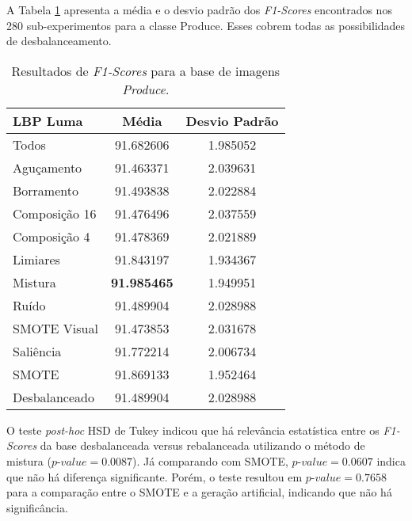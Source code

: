
A Tabela \ref{tab:resultados:3.3} apresenta a média e o desvio padrão dos \textit{F1-Scores} encontrados nos 280 sub-experimentos para a classe Produce. Esses cobrem todas as possibilidades de desbalanceamento.

\begin{table}[H]
\begin{center}
\caption{Resultados de \textit{F1-Scores} para a base de imagens \textit{Produce}.}
\label{tab:resultados:3.3}
\begin{tabular}{|l|c|c|}
\hline
\textbf{LBP Luma} & \textbf{Média}     & \textbf{Desvio Padrão} \\ \hline
   Todos        &  91.682606 &  1.985052  \\ \hline
  Aguçamento    &  91.463371 &  2.039631  \\ \hline
  Borramento    &  91.493838 &  2.022884  \\ \hline
  Composição 16 &  91.476496 &  2.037559  \\ \hline
  Composição 4  &  91.478369 &  2.021889  \\ \hline
  Limiares      &  91.843197 &  1.934367  \\ \hline
  Mistura       &  \textbf{91.985465} &  1.949951  \\ \hline
  Ruído         &  91.489904 &  2.028988  \\ \hline
  SMOTE Visual  &  91.473853 &  2.031678  \\ \hline
  Saliência     &  91.772214 &  2.006734  \\ \hline
 SMOTE          &  91.869133 &  1.952464  \\ \hline
Desbalanceado   &  91.489904 &  2.028988  \\ \hline
\end{tabular}
\end{center}
\end{table}


O teste \textit{post-hoc} HSD de Tukey indicou que há relevância estatística entre os \textit{F1-Scores} da base desbalanceada versus rebalanceada utilizando o método de mistura ($ \textit{p-value} = 0.0087$). Já comparando com SMOTE, $\textit{p-value} = 0.0607$ indica que não há diferença significante. Porém, o teste resultou em $\textit{p-value} = 0.7658$ para a comparação entre o SMOTE e a geração artificial, indicando que não há significância.

